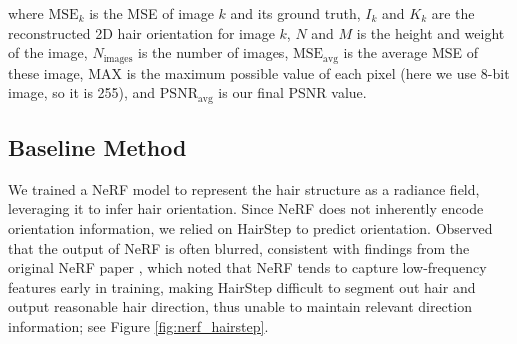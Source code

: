 \documentclass[12pt]{article}
\begin{document}
where $\text{MSE}_k$ is the MSE of image $k$ and its ground truth, $I_k$ and $K_k$ are the reconstructed 2D hair orientation for image $k$, $N$ and $M$ is the height and weight of the image, $N_\text{images}$ is the number of images, $\text{MSE}_\text{avg}$ is the average MSE of these image, MAX is the maximum possible value of each pixel (here we use 8-bit image, so it is 255), and $\text{PSNR}_\text{avg}$ is our final PSNR value.

\subsection{Baseline Method}

We trained a NeRF model to represent the hair structure as a radiance field, leveraging it to infer hair orientation. Since NeRF does not inherently encode orientation information, we relied on HairStep to predict orientation. Observed that the output of NeRF is often blurred, consistent with findings from the original NeRF paper \cite{mildenhall_nerf_2020}, which noted that NeRF tends to capture low-frequency features early in training, making HairStep difficult to segment out hair and output reasonable hair direction, thus unable to maintain relevant direction information; see Figure \ref{fig:nerf_hairstep}.
\end{document}
